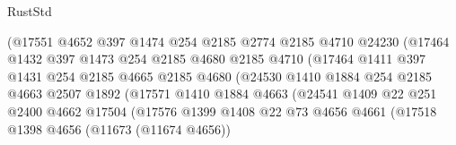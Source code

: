 \begin{lexlean}{RustStd}
\begin{coremodule}
                                (@17551
                                  @4652
                                  @397
                                  @1474
                                  @254
                                  @2185
                                  @2774
                                  @2185
                                  @4710
                                  @24230
                                  (@17464
                                    @1432
                                    @397
                                    @1473
                                    @254
                                    @2185
                                    @4680
                                    @2185
                                    @4710
                                    (@17464
                                      @1411
                                      @397
                                      @1431
                                      @254
                                      @2185
                                      @4665
                                      @2185
                                      @4680
                                      (@24530
                                        @1410
                                        @1884
                                        @254
                                        @2185
                                        @4663
                                        @2507
                                        @1892
                                        (@17571
                                          @1410
                                          @1884
                                          @4663
                                          (@24541
                                            @1409
                                            @22
                                            @251
                                            @2400
                                            @4662
                                            @17504
                                            (@17576
                                              @1399
                                              @1408
                                              @22
                                              @73
                                              @4656
                                              @4661
                                              (@17518
                                                @1398
                                                @4656
                                                (@11673 (@11674 @4656))

\end{coremodule}
\end{lexlean}
